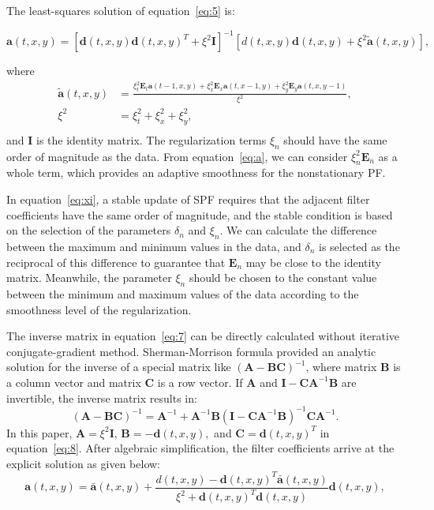 The least-squares solution of equation~\ref{eq:5} is:

\begin{equation}
  \label{eq:7}
  \mathbf{a}(t,x,y)=[\mathbf{d}(t,x,y)\mathbf{d}(t,x,y)^{T}+\xi^2\mathbf{I}]^{-1}
             [d(t,x,y)\mathbf{d}(t,x,y)+\xi^2\mathbf{\tilde{a}}(t,x,y)],
\end{equation}

where
\begin{equation}
\begin{aligned}
 \label{eq:a}
  \mathbf{\tilde{a}}(t,x,y)&=\frac{\xi_t^2\mathbf{E}_t\mathbf{a}(t-1,x,y)+
  \xi_x^2\mathbf{E}_x\mathbf{a}(t,x-1,y)+\xi_y^2\mathbf{E}_y\mathbf{a}(t,x,y-1)}
  {\xi^2},\\
  \xi^2&=\xi_t^2+\xi_x^2+\xi_y^2,\\
  \end{aligned}
\end{equation}
and $\mathbf{I}$ is the identity matrix. The regularization terms
$\xi_n$ should have the same order of magnitude as the data. From
equation~\ref{eq:a}, we can consider $\xi^2_{n}\mathbf{E}_n$ as a
whole term, which provides an adaptive smoothness for the
nonstationary PF.

In equation~\ref{eq:xi}, a stable update of SPF requires that the
adjacent filter coefficients have the same order of magnitude, and the
stable condition is based on the selection of the parameters
$\delta_n$ and $\xi_n$. We can calculate the difference between the
maximum and minimum values in the data, and $\delta_n$ is selected as
the reciprocal of this difference to guarantee that $\mathbf{E}_n$ may
be close to the identity matrix. Meanwhile, the parameter $\xi_n$
should be chosen to the constant value between the minimum and maximum
values of the data according to the smoothness level of the
regularization.

The inverse matrix in equation~\ref{eq:7} can be directly calculated
without iterative conjugate-gradient method. Sherman-Morrison formula
\cite[]{Hager89} provided an analytic solution for the inverse of a
special matrix like $(\mathbf{A}-\mathbf{BC})^{-1}$, where matrix
$\mathbf{B}$ is a column vector and matrix $\mathbf{C}$ is a row
vector. If $\mathbf{A}$ and
$\mathbf{I}-\mathbf{C}\mathbf{A}^{-1}\mathbf{B}$ are invertible, the
inverse matrix results in:
\begin{equation}
  \label{eq:8}
  (\mathbf{A}-\mathbf{BC})^{-1}=\mathbf{A}^{-1}+
  \mathbf{A}^{-1}\mathbf{B}(\mathbf{I}-\mathbf{C}\mathbf{A}^{-1}\mathbf{B})^{-1}
  \mathbf{C}\mathbf{A}^{-1}.
\end{equation}
In this paper, $\mathbf{A}=\xi^2\mathbf{I}$,
$\mathbf{B}=-\mathbf{d}(t,x,y),$ and
$\mathbf{C}=\mathbf{d}(t,x,y)^{T}$ in equation~\ref{eq:8}. After
algebraic simplification, the filter coefficients arrive at the explicit solution as given below:
\begin{equation}
 \label{eq:9}
  \mathbf{a}(t,x,y)=\mathbf{\bar{a}}(t,x,y)+
  \frac{
  d(t,x,y)-\mathbf{d}(t,x,y)^T\mathbf{\bar{a}}(t,x,y)}
  {
  \xi^2+\mathbf{d}(t,x,y)^T\mathbf{d}(t,x,y)}\mathbf{d}(t,x,y),
\end{equation}

